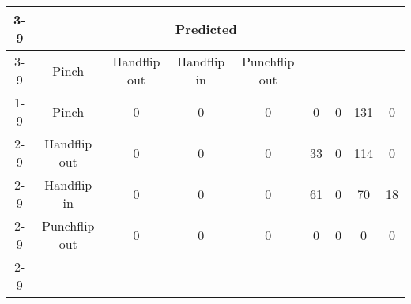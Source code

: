 \documentclass{standalone}
\begin{document}
 
 \begin{tabular}{|c |c |c |c |c |c |c |c |c |}
\cline{3-9}\multicolumn{2}{c|}{} & \multicolumn{7}{c|}{Predicted} \\ 
\cline{3-9} \multicolumn{2}{c |}{ } & Pinch & Handflip out & Handflip in & Punchflip out\\ 
\cline{1-9}\multirow{7}{*}{\rotatebox[origin=c]{90}{Actual}} & Pinch & 0 & 0 & 0 & 0 & 0 & 131 & 0\\ 
 \cline{2-9} & Handflip out & 0 & 0 & 0 & 33 & 0 & 114 & 0\\ 
 \cline{2-9} & Handflip in & 0 & 0 & 0 & 61 & 0 & 70 & 18\\ 
 \cline{2-9} & Punchflip out & 0 & 0 & 0 & 0 & 0 & 0 & 0\\ 
 \cline{2-9}\hline \end{tabular}
 
\end{document}
